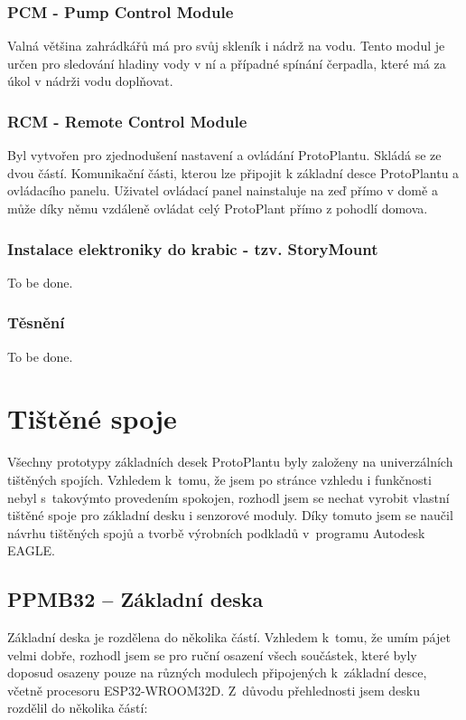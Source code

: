 \subsection{PCM - Pump Control Module}
\label{subsec:PCM}
Valná většina zahrádkářů má pro svůj skleník i nádrž na vodu.
Tento modul je určen pro sledování hladiny vody v ní a případné spínání čerpadla, které má za úkol v nádrži vodu doplňovat.

\subsection{RCM - Remote Control Module}
\label{subsec:RCM}
Byl vytvořen pro zjednodušení nastavení a ovládání ProtoPlantu.
Skládá se ze dvou částí. 
Komunikační části, kterou lze připojit k základní desce ProtoPlantu a ovládacího panelu. 
Uživatel ovládací panel nainstaluje na zeď přímo v domě a může díky němu vzdáleně ovládat celý ProtoPlant přímo z pohodlí domova. 

\subsection{Instalace elektroniky do krabic - tzv. StoryMount}
To be done.

\subsection{Těsnění}
To be done.

\chapter{Tištěné spoje}
Všechny prototypy základních desek ProtoPlantu byly založeny na univerzálních tištěných spojích. Vzhledem k~tomu, že jsem po stránce vzhledu i funkčnosti nebyl s~takovýmto provedením spokojen, rozhodl jsem se nechat vyrobit vlastní tištěné spoje pro základní desku i senzorové moduly.
Díky tomuto jsem se naučil návrhu tištěných spojů a tvorbě výrobních podkladů v~programu Autodesk EAGLE.

\section{PPMB32 -- Základní deska}
\label{subsec:motherBoard}
Základní deska je rozdělena do několika částí. 
Vzhledem k~tomu, že umím pájet velmi dobře, rozhodl jsem se pro ruční osazení všech součástek, které byly doposud osazeny pouze na různých modulech připojených k~základní desce, včetně procesoru ESP32-WROOM32D.
Z~důvodu přehlednosti jsem desku rozdělil do několika částí:

